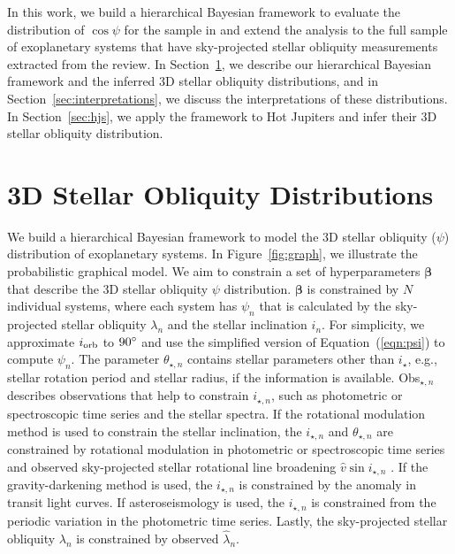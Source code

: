 \documentclass[twocolumn,times]{aastex631}
\begin{document}
In this work, we build a hierarchical Bayesian framework to evaluate the distribution of $\cos{\psi}$ for the sample in \cite{Albrecht21} and extend the analysis to the full sample of exoplanetary systems that have sky-projected stellar obliquity measurements extracted from the \cite{Albrecht22} review.
In Section~\ref{sec:hbm}, we describe our hierarchical Bayesian framework and the inferred 3D stellar obliquity distributions, and in Section~\ref{sec:interpretations}, we discuss the interpretations of these distributions. In Section~\ref{sec:hjs}, we apply the framework to Hot Jupiters and infer their 3D stellar obliquity distribution.

\begin{figure*}
    \label{fig:coord}
\end{figure*}

\section{3D Stellar Obliquity Distributions} \label{sec:hbm}
We build a hierarchical Bayesian framework to model the 3D stellar obliquity ($\psi$) distribution of exoplanetary systems. In Figure~\ref{fig:graph}, we illustrate the probabilistic graphical model. We aim to constrain a set of hyperparameters $\bm{\beta}$ that describe the 3D stellar obliquity $\psi$ distribution. $\bm{\beta}$ is constrained by $N$ individual systems, where each system has $\psi_n$ that is calculated by the sky-projected stellar obliquity $\lambda_n$ and the stellar inclination $i_n$. For simplicity, we approximate $i_{\rm orb}$ to $90\mbox{$^\circ$}$ and use the simplified version of Equation~(\ref{eqn:psi}) to compute $\psi_n$.
The parameter $\theta_{\star, n}$ contains stellar parameters other than $i_\star$, e.g., stellar rotation period and stellar radius, if the information is available.
Obs$_{\star,n}$ describes observations that help to constrain $i_{\star,n}$, such as photometric or spectroscopic time series and the stellar spectra. If the rotational modulation method is used to constrain the stellar inclination, the $i_{\star,n}$ and $\theta_{\star,n}$ are constrained by rotational modulation in photometric or spectroscopic time series and observed sky-projected stellar rotational line broadening $\hat{v}\sin{i_{\star,n}}$ \citep[e.g.,][]{Masuda20}. If the gravity-darkening method is used, the $i_{\star,n}$ is constrained by the anomaly in transit light curves. If asteroseismology is used, the $i_{\star,n}$ is constrained from the periodic variation in the photometric time series.
Lastly, the sky-projected stellar obliquity $\lambda_n$ is constrained by observed $\hat{\lambda}_n$.
\end{document}
